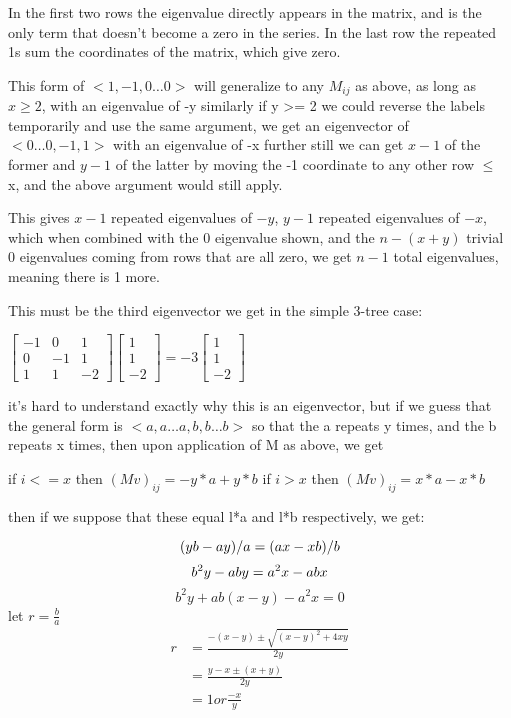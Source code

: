 \documentclass{report}
\begin{document}
In the first two rows the eigenvalue directly appears in the matrix, and is the
only term that doesn't become a zero in the series.
In the last row the repeated 1s sum the coordinates of the matrix, which give
zero.

This form of $<1, -1, 0\ldots 0>$ will generalize to any $M_{ij}$ as above, as long as
$x \geq 2$, with an eigenvalue of -y
similarly if y >= 2 we could reverse the labels temporarily and use the same
argument, we get an eigenvector of $<0\ldots 0, -1, 1>$ with an eigenvalue of -x
further still we can get $x-1$ of the former and $y-1$ of the latter by moving the
-1 coordinate to any other row $\leq$ x, and the above argument would still apply.

This gives $x-1$ repeated eigenvalues of $-y$, $y-1$ repeated eigenvalues of $-x$,
which when combined with the 0 eigenvalue shown, and the $n - (x + y)$ trivial $0$
eigenvalues coming from rows that are all zero, we get $n-1$ total eigenvalues,
meaning there is 1 more.

This must be the third eigenvector we get in the simple 3-tree case:

$
\left[\begin{matrix}
	-1 & 0 & 1\\
	0 & -1 & 1\\
	1 & 1 & -2
\end{matrix}\right]
\left[\begin{matrix}
	1\\
	1\\
	-2
\end{matrix}\right]
=
-3
\left[\begin{matrix}
	1\\
	1\\
	-2
\end{matrix}\right]
$

it's hard to understand exactly why this is an eigenvector, but if we guess
that the general form is $<a, a\ldots a, b, b\ldots b>$ so that the a repeats y
times, and the b repeats x times, then upon application of M as above, we get

if $i <= x$
then ${(Mv)}_{ij} = -y*a + y*b$
if $i > x$
then ${(Mv)}_{ij} = x*a - x*b$

then if we suppose that these equal l*a and l*b respectively, we get:

\begin{equation*}
	(yb - ay)/a = (ax - xb)/b\\
\end{equation*}
\begin{equation*}
	b^2y - aby = a^2x - abx\\
\end{equation*}
\begin{equation*}
	b^2y + ab(x - y) - a^2x = 0
\end{equation*}
let $r = \frac{b}{a}$
\begin{align*}
	r &= \frac{-(x-y) \pm \sqrt{{(x-y)}^2 + 4xy}}{2y}\\
	  &= \frac{y - x \pm (x + y)}{2y}\\
	  &= 1 or \frac{-x}{y}
\end{align*}
\end{document}

